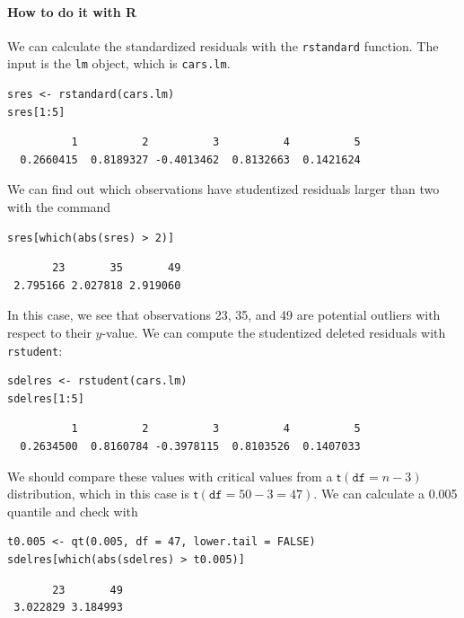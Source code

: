 \documentclass[captions=tableheading]{scrbook}
\begin{document}
\paragraph*{How to do it with \textsf{R}}

We can calculate the standardized residuals with the \texttt{rstandard} function. The input is the \texttt{lm} object, which is \texttt{cars.lm}.


\begin{verbatim}
sres <- rstandard(cars.lm)
sres[1:5]
\end{verbatim}

\begin{verbatim}
          1          2          3          4          5 
  0.2660415  0.8189327 -0.4013462  0.8132663  0.1421624
\end{verbatim}

We can find out which observations have studentized residuals larger than two with the command


\begin{verbatim}
sres[which(abs(sres) > 2)]
\end{verbatim}

\begin{verbatim}
       23       35       49 
 2.795166 2.027818 2.919060
\end{verbatim}

In this case, we see that observations 23, 35, and 49 are potential outliers with respect to their \(y\)-value.  We can compute the studentized deleted residuals with \texttt{rstudent}:


\begin{verbatim}
sdelres <- rstudent(cars.lm)
sdelres[1:5]
\end{verbatim}

\begin{verbatim}
          1          2          3          4          5 
  0.2634500  0.8160784 -0.3978115  0.8103526  0.1407033
\end{verbatim}

We should compare these values with critical values from a \(\mathsf{t}(\mathtt{df}=n-3)\) distribution, which in this case is \(\mathsf{t}(\mathtt{df}=50-3=47)\). We can calculate a 0.005 quantile and check with 


\begin{verbatim}
t0.005 <- qt(0.005, df = 47, lower.tail = FALSE)
sdelres[which(abs(sdelres) > t0.005)]
\end{verbatim}

\begin{verbatim}
       23       49 
 3.022829 3.184993
\end{verbatim}
\end{document}
